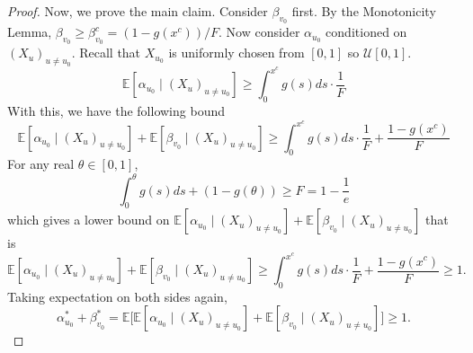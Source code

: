 \begin{proof}
    Now, we prove the main claim. Consider $\beta_{v_0}$ first. By the Monotonicity Lemma, $\beta_{v_0} \geq \beta_{v_0}^c = (1-g(x^c)) / F$. Now consider $\alpha_{u_0}$ conditioned on $(X_u)_{u \neq u_0}$. Recall that $X_{u_0}$ is uniformly chosen from $[0,1]$ so $\mathcal{U}[0,1]$.
    $$
    \mathbb{E}\left[ \alpha_{u_0} \mid (X_u)_{u \neq u_0} \right] \geq \int_{0}^{x^c} g(s) ds \cdot \frac{1}{F}
    $$
    With this, we have the following bound
    $$
    \mathbb{E}\left[ \alpha_{u_0} \mid (X_u)_{u \neq u_0} \right] + \mathbb{E}\left[ \beta_{v_0} \mid (X_u)_{u \neq u_0} \right] \geq \int_{0}^{x^c} g(s) ds \cdot \frac{1}{F} + \frac{1-g(x^c)}{F}
    $$
    For any real $\theta \in [0,1]$,
    $$
    \int_0^\theta g(s) ds + (1-g(\theta)) \geq F = 1-\frac{1}{e}
    $$
    which gives a lower bound on $\mathbb{E}\left[ \alpha_{u_0} \mid (X_u)_{u \neq u_0} \right] + \mathbb{E}\left[ \beta_{v_0} \mid (X_u)_{u \neq u_0} \right]$ that is
    $$
    \mathbb{E}\left[ \alpha_{u_0} \mid (X_u)_{u \neq u_0} \right] + \mathbb{E}\left[ \beta_{v_0} \mid (X_u)_{u \neq u_0} \right] \geq \int_{0}^{x^c} g(s) ds \cdot \frac{1}{F} + \frac{1-g(x^c)}{F} \geq 1.
    $$
    Taking expectation on both sides again,
    $$
    \alpha_{u_0}^* + \beta_{v_0}^* = \mathbb{E}\big[\mathbb{E}\left[ \alpha_{u_0} \mid (X_u)_{u \neq u_0} \right] + \mathbb{E}\left[ \beta_{v_0} \mid (X_u)_{u \neq u_0} \right]\big] \geq 1.
    $$
\end{proof}
